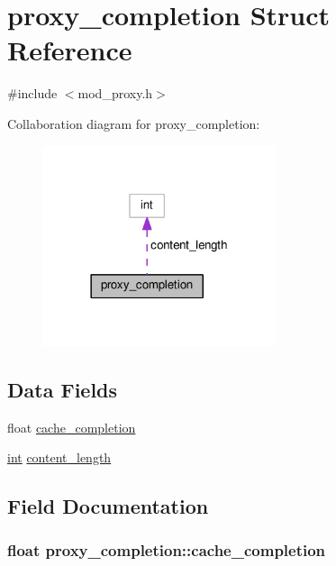 \hypertarget{structproxy__completion}{}\section{proxy\+\_\+completion Struct Reference}
\label{structproxy__completion}


{\ttfamily \#include $<$mod\+\_\+proxy.\+h$>$}



Collaboration diagram for proxy\+\_\+completion\+:
\nopagebreak
\begin{figure}[H]
\begin{center}
\leavevmode
\includegraphics[width=194pt]{structproxy__completion__coll__graph}
\end{center}
\end{figure}
\subsection*{Data Fields}
\begin{DoxyCompactItemize}
\item 
float \hyperlink{structproxy__completion_ac470326a91f6b8e2d7e505e979004256}{cache\+\_\+completion}
\item 
\hyperlink{pcre_8txt_a42dfa4ff673c82d8efe7144098fbc198}{int} \hyperlink{structproxy__completion_ad8a5f4c4146e7b7aee9ea6f9018b4153}{content\+\_\+length}
\end{DoxyCompactItemize}


\subsection{Field Documentation}
\subsubsection[{\texorpdfstring{cache\+\_\+completion}{cache_completion}}]{\setlength{\rightskip}{0pt plus 5cm}float proxy\+\_\+completion\+::cache\+\_\+completion}\hypertarget{structproxy__completion_ac470326a91f6b8e2d7e505e979004256}{}\label{structproxy__completion_ac470326a91f6b8e2d7e505e979004256}

